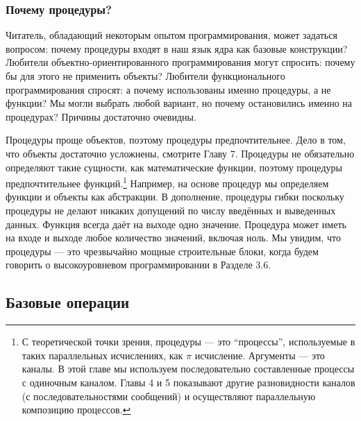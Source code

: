 \subsubsection{Почему процедуры?}

Читатель, обладающий некоторым опытом программирования, может задаться вопросом: почему процедуры входят в наш язык ядра как базовые конструкции? Любители объектно-ориентированного программирования могут спросить: почему бы для этого не применить объекты? Любители функционального программирования спросят: а почему использованы именно процедуры, а не функции? Мы могли выбрать любой вариант, но почему остановились именно на процедурах? Причины достаточно очевидны.

Процедуры проще объектов, поэтому процедуры предпочтительнее. Дело в том, что объекты достаточно усложнены, смотрите Главу 7. Процедуры не обязательно определяют такие сущности, как математические функции, поэтому процедуры предпочтительнее функций.\footnote{С теоретической точки зрения, процедуры --- это ``процессы'', используемые в таких параллельных исчислениях, как $\pi$ исчисление. Аргументы --- это каналы. В этой главе мы используем последовательно составленные процессы с одиночным каналом. Главы 4 и 5 показывают другие разновидности каналов (с последовательностями сообщений) и осуществляют параллельную композицию процессов.} Например, на основе процедур мы определяем функции и объекты как абстракции. В дополнение, процедуры гибки поскольку процедуры не делают никаких допущений по числу введённых и выведенных данных. Функция всегда даёт на выходе одно значение. Процедура может иметь на входе и выходе любое количество значений, включая ноль. Мы увидим, что процедуры --- это чрезвычайно мощные строительные блоки, когда будем говорить о высокоуровневом программировании в Разделе 3.6.

\subsection{Базовые операции}\label{subsection:basic_operations}

